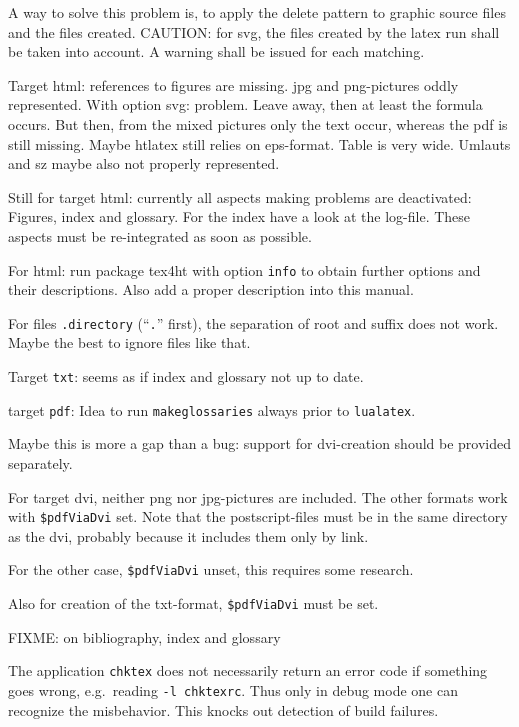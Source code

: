 \documentclass[12pt]{book}
\begin{document}
A way to solve this problem is, 
to apply the delete pattern to graphic source files 
and the files created. 
CAUTION\@: for svg, 
the files created by the latex run shall be taken into account. 
A warning shall be issued for each matching. 


Target html: references to figures are missing. 
jpg and png-pictures oddly represented. 
With option svg: problem. 
Leave away, then at least the formula occurs. 
But then, from the mixed pictures only the text occur, 
whereas the pdf is still missing. 
Maybe htlatex still relies on eps-format. 
Table is very wide. 
Umlauts and sz maybe also not properly represented. 

Still for target html: currently all aspects making problems 
are deactivated: 
Figures, index and glossary. 
For the index have a look at the log-file. 
These aspects must be re-integrated as soon as possible. 

For html: run package tex4ht with option \texttt{info} 
to obtain further options and their descriptions. 
Also add a proper description into this manual. 

For files \texttt{.directory} (``\texttt{.}'' first), 
the separation of root and suffix does not work. 
Maybe the best to ignore files like that. 

Target \texttt{txt}: seems as if index and glossary not up to date. 

target \texttt{pdf}: Idea to run \texttt{makeglossaries} 
always prior to \texttt{lualatex}. 

Maybe this is more a gap than a bug: 
support for dvi-creation should be provided separately. 

For target dvi, 
neither png nor jpg-pictures are included. 
The other formats work with \texttt{\$pdfViaDvi} set. 
Note that the postscript-files must be in the same directory 
as the dvi, probably because it includes them 
only by link. 

For the other case, \texttt{\$pdfViaDvi} unset, this requires some research. 

Also for creation of the txt-format, 
\texttt{\$pdfViaDvi} must be set. 

FIXME\@: on bibliography, index and glossary 

The application \texttt{chktex} does not necessarily return an error code 
if something goes wrong, e.g.~reading \texttt{-l chktexrc}. 
Thus only in debug mode one can recognize the misbehavior. 
This knocks out detection of build failures. 
\end{document}
